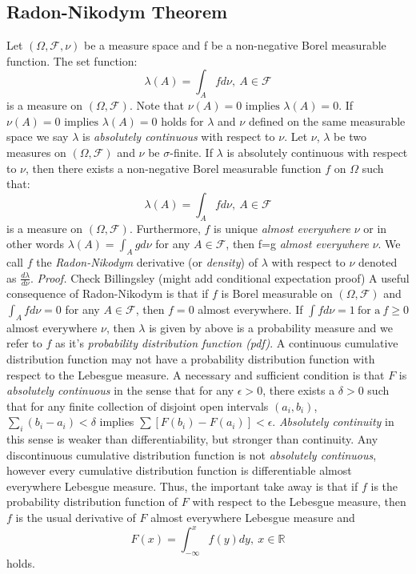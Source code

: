 \documentclass{article}
\begin{document}
\subsection{Radon-Nikodym Theorem}
Let $(\Omega,\mathcal{F},\nu)$ be a measure space and f be a non-negative Borel measurable function. The set function:
\[
\lambda(A)=\int_{A}fd\nu, \ A\in \mathcal{F}
\]
is a measure on $(\Omega,\mathcal{F})$. Note that $\nu(A)= 0 \text{ implies }\lambda(A)=0$. If $\nu(A)= 0 \text{ implies }\lambda(A)=0$ holds for $\lambda$ and $\nu$ defined on the same measurable space we say $\lambda$ is \emph{absolutely continuous} with respect to $\nu$. \newline \newline
Let $\nu$, $\lambda$ be two measures on  $(\Omega,\mathcal{F})$ and $\nu$ be $\sigma$-finite. If $\lambda$ is absolutely continuous with respect to $\nu$, then there exists a non-negative Borel measurable function $f$ on $\Omega$ such that:
\[
\lambda(A)=\int_{A}fd\nu, \ A\in \mathcal{F}
\]
is a measure on $(\Omega,\mathcal{F})$. Furthermore, $f$ is unique \emph{almost everywhere} $\nu$ or in other words $\lambda(A)=\int_{A}gd\nu$ for any $A\in \mathcal{F}$, then f=g \emph{almost everywhere} $\nu$. We call $f$ the \emph{Radon-Nikodym} derivative (or \emph{density}) of $\lambda$ with respect to $\nu$ denoted as $\frac{d\lambda}{d\nu}$. \newline \newline
\textit{Proof.}\newline \newline
Check Billingsley (might add conditional expectation proof)\newline \newline
A useful consequence of Radon-Nikodym is that if $f$ is Borel measurable on $(\Omega,\mathcal{F})$ and $\int_Afd\nu=0$ for any $A\in \mathcal{F}$, then $f=0$ almost everywhere. If $\int fd\nu=1 \ \text{for a} \ f \geq 0$ almost everywhere $\nu$, then $\lambda$ is given by above is a probability measure and we refer to $f$ as it's \emph{probability distribution function (pdf)}.\newline \newline
A continuous cumulative distribution function may not have a probability distribution function with respect to the Lebesgue measure. A necessary and sufficient condition is that $F$ is \emph{absolutely continuous} in the sense that for any $\epsilon >0$, there exists a $\delta>0$ such that for any finite collection of disjoint open intervals $(a_i,b_i)$, $\sum_i(b_i-a_i)<\delta$ implies $\sum[F(b_i)-F(a_i)] <\epsilon$. \emph{Absolutely continuity} in this sense is weaker than differentiability, but stronger than continuity.\newline \newline
 Any discontinuous cumulative distribution function is not \emph{absolutely continuous}, however every cumulative distribution function is differentiable almost everywhere Lebesgue measure. Thus, the important take away is that if $f$ is the probability distribution function of $F$ with respect to the Lebesgue measure, then $f$ is the usual derivative of $F$ almost everywhere Lebesgue measure and 
\[
F(x)=\int_{-\infty}^xf(y)dy, \ x  \in \mathbb{R}
\]
holds.
\end{document}
